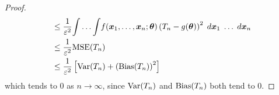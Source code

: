 \begin{proof}
\begin{align*}
         & \leq \frac{1}{\varepsilon^2} {\int \ldots \int} f(\bm{x}_1 , \ldots , \bm{x}_n ; \bm{\theta}) \left( T_n - g (\bm{\theta}) \right)^2 \; d \bm{x}_1 \; \ldots \; d \bm{x}_n                                                       \\
         & \leq \frac{1}{\varepsilon^2} {\operatorname{MSE}} (T_n)                                                                                                                                                                                          \\
         & \leq \frac{1}{\varepsilon^2} \left[ {\operatorname{Var}} (T_n) + \left( {\operatorname{Bias}} (T_n) \right)^2 \right]
    \end{align*}
    which tends to $0$ as $n \to \infty$, since ${\operatorname{Var}} (T_n)$ and ${\operatorname{Bias}} (T_n)$ both tend to $0$.
\end{proof}

